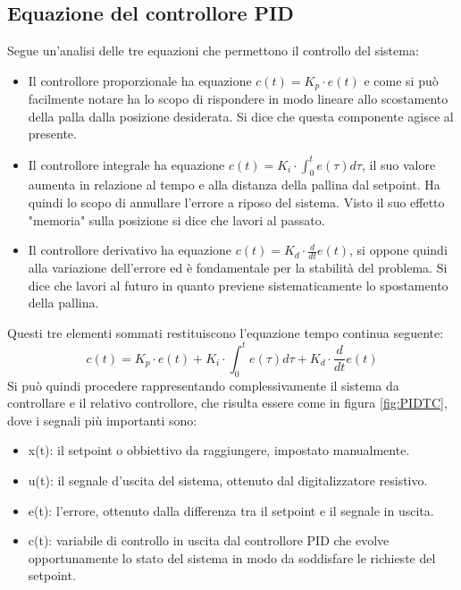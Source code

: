 \documentclass[12pt,twoside,openright]{report}
\begin{document}
\subsection{Equazione del controllore PID}

Segue un'analisi delle tre equazioni che permettono il controllo del sistema:

\begin{itemize}
\item Il controllore proporzionale ha equazione $c(t)=K_p \cdot e(t)$ e come si può facilmente notare ha lo scopo di rispondere in modo lineare allo scostamento della palla dalla posizione desiderata. Si dice che questa componente agisce al presente.
\item Il controllore integrale ha equazione $c(t)=K_i \cdot \int_0^t e(\tau)d\tau$, il suo valore aumenta in relazione al tempo e alla distanza della pallina dal setpoint. Ha quindi lo scopo di annullare l'errore a riposo del sistema. Visto il suo effetto "memoria" sulla posizione si dice che lavori al passato.
\item Il controllore derivativo ha equazione $c(t)=K_d\cdot \frac{d}{dt}e(t)$, si oppone quindi alla variazione dell'errore ed è fondamentale per la stabilità del problema. Si dice che lavori al futuro in quanto previene sistematicamente lo spostamento della pallina.
\end{itemize}
Questi tre elementi sommati restituiscono l'equazione tempo continua seguente:
\begin{equation}\label{pidtc}
    c(t)=K_p \cdot e(t) + K_i \cdot \int_0^t e(\tau)d\tau + K_d\cdot \frac{d}{dt}e(t)
\end{equation}
Si può quindi procedere rappresentando complessivamente il sistema da controllare
e il relativo controllore, che risulta essere come in figura \ref{fig:PIDTC}, dove i segnali più importanti sono:
\begin{itemize}
\item x(t): il setpoint o obbiettivo da raggiungere, impostato manualmente.
\item u(t): il segnale d'uscita del sistema, ottenuto dal digitalizzatore resistivo.
\item e(t): l'errore, ottenuto dalla differenza tra il setpoint e il segnale in uscita.
\item c(t): variabile di controllo in uscita dal controllore PID che evolve opportunamente lo stato del sistema in modo da soddisfare le richieste del setpoint.

\end{itemize}
\end{document}
